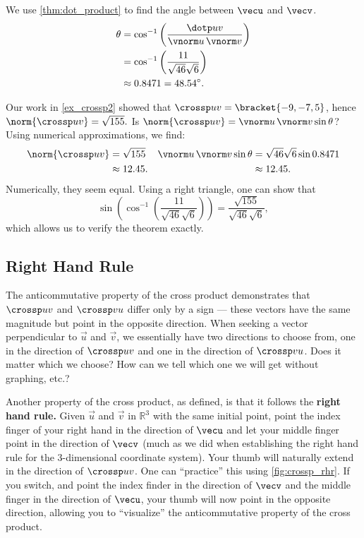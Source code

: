 {We use \autoref{thm:dot_product} to find the angle between $\vecu$ and $\vecv$. 
\begin{align*}
\theta &= \cos^{-1}\left(\frac{\dotp uv}{\vnorm u\, \vnorm v}\right) \\
			&= \cos^{-1}\left(\frac{11}{\sqrt{46}\sqrt{6}}\right)\\
			&\approx 0.8471 = 48.54^\circ.
\end{align*}

Our work in \autoref{ex_crossp2} showed that $\crossp uv = \bracket{-9,-7,5}$, hence $\norm{\crossp uv} = \sqrt{155}.$ Is $\norm{\crossp uv} = \vnorm u\, \vnorm v\sin\theta$? Using numerical approximations, we find:
\begin{align*}
\norm{\crossp uv}
 &=\sqrt{155}  & \vnorm u\,\vnorm v \sin\theta & = \sqrt{46}\sqrt{6}\sin 0.8471\\
 &\approx 12.45. & &\approx 12.45.
\end{align*}
Numerically, they seem equal. Using a right triangle, one can show that 
\[\sin\left(\cos^{-1}\left(\frac{11}{\sqrt{46}\sqrt{6}}\right)\right) = \frac{\sqrt{155}}{\sqrt{46}\sqrt{6}},\]
which allows us to verify the theorem exactly.}

\subsection*{Right Hand Rule}

The anticommutative property of the cross product demonstrates that $\crossp uv$ and $\crossp vu$ differ only by a sign --- these vectors have the same magnitude but point in the opposite direction. When seeking a vector perpendicular to $\vec u$ and $\vec v$, we essentially have two directions to choose from, one in the direction of $\crossp uv$ and one in the direction of $\crossp vu$. Does it matter which we choose? How can we tell which one we will get without graphing, etc.?

Another property of the cross product, as defined, is that it follows the \textbf{right hand rule.} Given $\vec u$ and $\vec v$ in $\mathbb{R}^3$ with the same initial point, point the index finger of your right hand in the direction of $\vecu$ and let your middle finger point in the direction of $\vecv$ (much as we did when establishing the right hand rule for the 3-dimensional coordinate system). Your thumb will naturally extend in the direction of $\crossp uv$. One can ``practice'' this using \autoref{fig:crossp_rhr}. If you switch, and point the index finder in the direction of $\vecv$ and the middle finger in the direction of $\vecu$, your thumb will now point in the opposite direction, allowing you to ``visualize'' the anticommutative property of the cross product.

